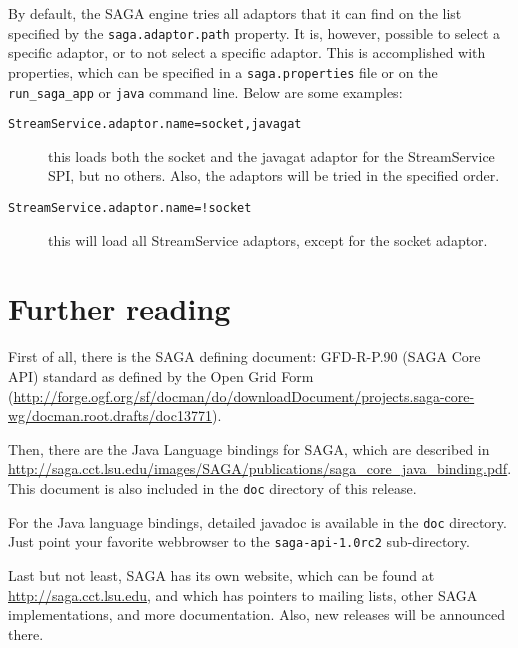 \documentclass[a4paper,10pt]{article}
\begin{document}
By default, the SAGA engine tries all adaptors that it can find on the list
specified by the \texttt{saga.adaptor.path} property.
It is, however, possible to select a specific
adaptor, or to not select a specific adaptor. This is accomplished
with properties, which can be specified in a \texttt{saga.properties} file or
on the \texttt{run\_saga\_app} or \texttt{java} command line.
Below are some examples:

\begin{description}

\item[\texttt{StreamService.adaptor.name=socket,javagat}]
this loads both the socket and the javagat adaptor for
the StreamService SPI, but no others. Also, the adaptors will
be tried in the specified order.

\item[\texttt{StreamService.adaptor.name=!socket}]
this will load all StreamService adaptors, except for the socket
adaptor.

\end{description}

\section{Further reading}

First of all, there is the SAGA defining document:
GFD-R-P.90 (SAGA Core API) standard as defined by the
Open Grid Form (\url{http://forge.ogf.org/sf/docman/do/downloadDocument/projects.saga-core-wg/docman.root.drafts/doc13771}).

Then, there are the Java Language bindings for SAGA, which
are described in \url{http://saga.cct.lsu.edu/images/SAGA/publications/saga_core_java_binding.pdf}. This document is also included in the
\texttt{doc} directory of this release.

For the Java language bindings, detailed javadoc is available
in the \texttt{doc} directory. Just point your favorite webbrowser
to the \texttt{saga-api-1.0rc2} sub-directory.

Last but not least, SAGA has its own website,
which can be found at \url{http://saga.cct.lsu.edu},
and which has pointers to mailing lists, other SAGA implementations,
and more documentation. Also, new releases will be announced there.
\end{document}
